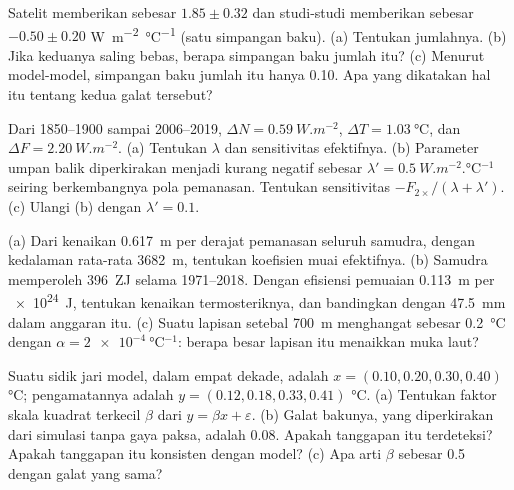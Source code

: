 \begin{exercise}[$\star\star$]\label{exo:b2:anthropogenic-climate-change:6}
Satelit memberikan  sebesar $1.85 \pm 0.32$ dan studi-studi memberikan  sebesar
$-0.50 \pm 0.20$ \unit{W.m^{-2}.\celsius^{-1}} (satu simpangan baku). (a) Tentukan jumlahnya.
(b) Jika keduanya saling bebas, berapa simpangan baku jumlah itu? (c) Menurut model-model,
simpangan baku jumlah itu hanya \num{0.10}. Apa yang dikatakan hal itu tentang kedua galat tersebut?
\end{exercise}

\begin{exercise}[$\star\star$]\label{exo:b2:anthropogenic-climate-change:7}
Dari 1850--1900 sampai 2006--2019, $\Delta N = \qty{0.59}{W.m^{-2}}$, $\Delta T = \qty{1.03}{\celsius}$,
dan $\Delta F = \qty{2.20}{W.m^{-2}}$. (a) Tentukan $\lambda$ dan sensitivitas efektifnya. (b) Parameter
umpan balik diperkirakan menjadi kurang negatif sebesar $\lambda' = \qty{0.5}{W.m^{-2}.\celsius^{-1}}$
seiring berkembangnya pola pemanasan. Tentukan sensitivitas $-F_{2\times}/(\lambda + \lambda')$.
(c) Ulangi (b) dengan $\lambda' = 0.1$.
\end{exercise}

\begin{exercise}[$\star\star$]\label{exo:b2:anthropogenic-climate-change:8}
(a) Dari kenaikan \qty{0.617}{m} per derajat pemanasan seluruh samudra, dengan kedalaman rata-rata
\qty{3682}{m}, tentukan koefisien muai efektifnya. (b) Samudra memperoleh \qty{396}{ZJ} selama
1971--2018. Dengan efisiensi pemuaian \qty{0.113}{m} per \qty{e24}{J}, tentukan kenaikan
termosteriknya, dan bandingkan dengan \qty{47.5}{mm} dalam anggaran itu. (c) Suatu lapisan setebal \qty{700}{m} menghangat sebesar
\qty{0.2}{\celsius} dengan $\alpha = \qty{2e-4}{\celsius^{-1}}$: berapa besar lapisan itu menaikkan muka laut?
\end{exercise}

\begin{exercise}[$\star\star$]\label{exo:b2:anthropogenic-climate-change:9}
Suatu sidik jari model, dalam empat dekade, adalah $x = (0.10, 0.20, 0.30, 0.40)$ \unit{\celsius};
pengamatannya adalah $y = (0.12, 0.18, 0.33, 0.41)$ \unit{\celsius}. (a) Tentukan faktor skala kuadrat terkecil
$\beta$ dari $y = \beta x + \varepsilon$. (b) Galat bakunya, yang diperkirakan dari simulasi tanpa gaya paksa,
adalah \num{0.08}. Apakah tanggapan itu terdeteksi? Apakah tanggapan itu konsisten dengan model? (c) Apa
arti $\beta$ sebesar 0.5 dengan galat yang sama?
\end{exercise}


